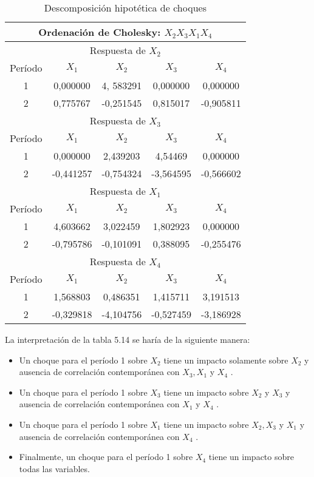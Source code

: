 \begin{enumerate}
\begin{table}[H]
\centering
\begin{tabular}{|c|c|c|c|c|}\hline
\multicolumn{5}{|c|}{Ordenaci\'{o}n de Cholesky: $X_{2} X_{3} X_{1} X_{4}$}\\ \hline
\multicolumn{5}{|c|}{Respuesta de $X_{2}$}\\ \hline
Per\'{i}odo & $X_{1}$ & $X_{2}$ & $X_{3}$ & $X_{4}$\\ \hline
1 & 0,000000 & 4, 583291 & 0,000000 & 0,000000\\ \hline
2 & 0,775767 & -0,251545 & 0,815017 & -0,905811\\ \hline
\multicolumn{5}{|c|}{Respuesta de $X_{3}$}\\ \hline
Per\'{i}odo & $X_{1}$ & $X_{2}$ & $X_{3}$ & $X_{4}$\\ \hline
1 & 0,000000 & 2,439203 & 4,54469 & 0,000000\\ \hline
2 & -0,441257 & -0,754324 & -3,564595 & -0,566602 \\ \hline
\multicolumn{5}{|c|}{Respuesta de $X_{1}$}\\ \hline
Per\'{i}odo & $X_{1}$ & $X_{2}$ & $X_{3}$ & $X_{4}$\\ \hline
1 & 4,603662 & 3,022459 & 1,802923 & 0,000000\\ \hline
2 & -0,795786 & -0,101091 & 0,388095 & -0,255476\\ \hline
\multicolumn{5}{|c|}{Respuesta de $X_{4}$}\\ \hline
Per\'{i}odo & $X_{1}$ & $X_{2}$ & $X_{3}$ & $X_{4}$\\ \hline
1 & 1,568803 & 0,486351 & 1,415711 & 3,191513\\ \hline
2 & -0,329818 & -4,104756 & -0,527459 & -3,186928 \\\hline
\end{tabular}
\caption{Descomposici\'{o}n hipot\'{e}tica de choques}
\label{tab27}
\end{table}

La interpretaci\'{o}n de la tabla 5.14 se har\'{i}a de la siguiente manera:
\begin{itemize}
      \item Un choque para el per\'{i}odo 1 sobre $X_{2}$ tiene un impacto solamente sobre $X_{2}$ y ausencia de correlaci\'{o}n contempor\'{a}nea con $X_{3}, X_{1}$ y $X_{4}$ .
      \item Un choque para el per\'{i}odo 1 sobre $X_{3}$ tiene un impacto sobre $X_{2}$ y $X_{3}$ y ausencia de correlaci\'{o}n contempor\'{a}nea con $X_{1}$ y $X_{4}$ .
      \item Un choque para el per\'{i}odo 1 sobre $X_{1}$ tiene un impacto sobre $X_{2}, X_{3}$ y $X_{1}$ y ausencia de correlaci\'{o}n contempor\'{a}nea con $X_{4}$ .
      \item Finalmente, un choque para el per\'{i}odo 1 sobre $X_{4}$ tiene un impacto sobre todas las variables.
\end{itemize}


\end{enumerate}
